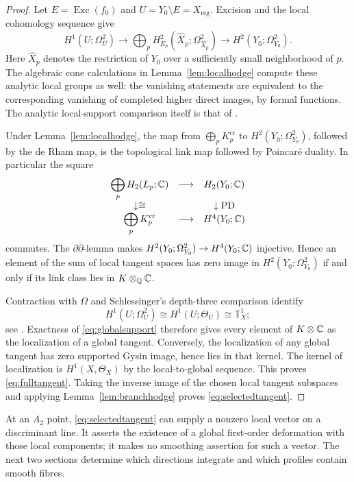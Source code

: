 \begin{proof}
Let $E=\operatorname{Exc}(f_0)$ and $U=Y_0\setminus E=X_{\mathrm{reg}}$.
Excision and the local cohomology sequence give
\begin{equation}\label{eq:globalsupport}
 H^1(U;\Omega^2_U)\longrightarrow
 \bigoplus_pH^2_{E_p}(\widehat X_p;\Omega^2_{\widehat X_p})
 \longrightarrow H^2(Y_0;\Omega^2_{Y_0}).
\end{equation}
Here $\widehat X_p$ denotes the restriction of $Y_0$ over a sufficiently
small neighborhood of $p$.  The algebraic cone calculations in
Lemma~\ref{lem:localhodge} compute these analytic local groups as well:
the vanishing statements are equivalent to the corresponding
vanishing of completed higher direct images, by formal functions.
The analytic local-support comparison itself is that of
\cite[Thm.~2.1]{FL22a}.

Under Lemma~\ref{lem:localhodge}, the map from
$\bigoplus_pK_p^{\mathrm{cr}}$ to $H^2(Y_0;\Omega^2_{Y_0})$, followed by
the de Rham map, is the topological link map followed by Poincar\'e
duality.  In particular the square
\[
\begin{array}{ccc}
 \displaystyle\bigoplus_pH_2(L_p;\mathbb{C})&\longrightarrow&H_2(Y_0;\mathbb{C})\\
 \downarrow\cong&&\downarrow\operatorname{PD}\\
 \displaystyle\bigoplus_pK_p^{\mathrm{cr}}&\longrightarrow&H^4(Y_0;\mathbb{C})
\end{array}
\]
commutes.  The $\partial\bar\partial$-lemma makes
$H^2(Y_0;\Omega^2_{Y_0})\to H^4(Y_0;\mathbb{C})$ injective.  Hence an element
of the sum of local tangent spaces has zero image in
$H^2(Y_0;\Omega^2_{Y_0})$ if and only if its link class lies in
$K\otimes_{\mathbb{Q}}\mathbb{C}$.

Contraction with $\Omega$ and Schlessinger's depth-three comparison
identify
\[
 H^1(U;\Omega^2_U)\cong H^1(U;\Theta_U)\cong\mathbb T^1_X;
\]
see \cite[Rem.~4.2]{FL22a}.  Exactness of \eqref{eq:globalsupport}
therefore gives every element of $K\otimes\mathbb{C}$ as the localization
of a global tangent.  Conversely, the localization of any global
tangent has zero supported Gysin image, hence lies in that kernel.
The kernel of localization is $H^1(X,\Theta_X)$ by the local-to-global
sequence.  This proves \eqref{eq:fulltangent}.  Taking the inverse
image of the chosen local tangent subspaces and applying
Lemma~\ref{lem:branchhodge} proves \eqref{eq:selectedtangent}.
\end{proof}

At an $A_2$ point, \eqref{eq:selectedtangent} can supply a nonzero
local vector on a discriminant line.  It asserts the existence of a
global first-order deformation with those local components; it makes
no smoothing assertion for such a vector.  The next two sections
determine which directions integrate and which profiles contain
smooth fibres.
